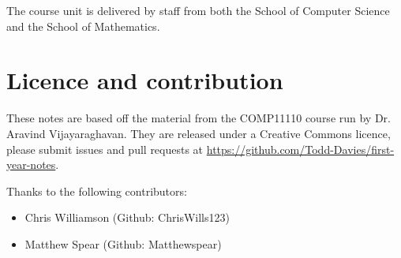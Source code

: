 The course unit is delivered by staff from both the School of Computer Science
and the School of Mathematics.

\section*{Licence and contribution}

These notes are based off the material from the COMP11110 course run by 
Dr. Aravind Vijayaraghavan. They are released
under a Creative Commons licence, please submit issues and pull requests at
\url{https://github.com/Todd-Davies/first-year-notes}.

Thanks to the following contributors:

\begin{itemize}
\item Chris Williamson (Github: ChrisWills123)
\item Matthew Spear (Github: Matthewspear)
\end{itemize}


